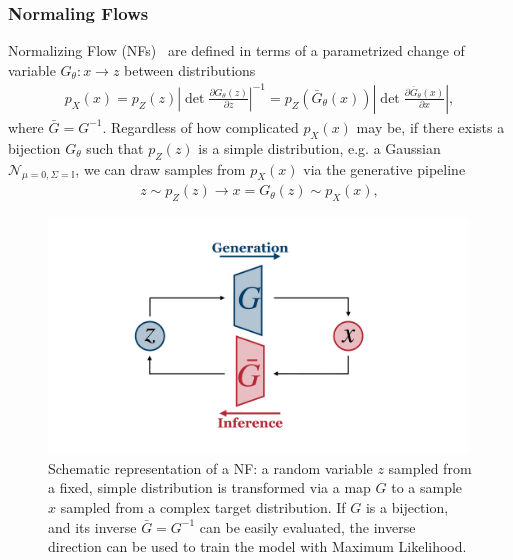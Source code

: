 \subsubsection{Normaling Flows}\label{intro:normflow}
Normalizing Flow (NFs)~\cite{inn,coupling2,glow, nflow1,papamakarios2019normalizing,nflow_review,mller2018neural, grathwohl2018ffjord,chen2019neural} are defined in terms of a parametrized change of variable $G_{\theta}: x \rightarrow z$ between distributions
%
\begin{align}\label{eq:nf}
p_X(x) = p_Z(z) \left|\det \frac{\partial G_{\theta}(z)}{\partial z}\right|^{-1} = p_Z(\bar{G}_{\theta}(x)) \left|\det \frac{\partial \bar{G}_{\theta}(x)}{\partial x}\right|,
\end{align}
%
where $\bar{G} = G^{-1}$.
Regardless of how complicated $p_{X}(x)$ may be, if there exists a bijection $G_{\theta}$ such that $p_Z(z)$ is a simple distribution, e.g. a Gaussian $\mathcal{N}_{\mu=0, \Sigma=\mathbb{I}}$, we can draw samples from $p_{X}(x)$ via the generative pipeline
%
\begin{align}
z \sim p_Z(z) \longrightarrow x = G_{\theta}(z)  \sim p_{X}(x),
\end{align}
%
%
\begin{figure}[t]
\centering
\includegraphics[page = 1, width=0.99\textwidth]{./figures/inn}
\caption{Schematic representation of a NF: a random variable $z$ sampled from a fixed, simple distribution is transformed via a map $G$ to a sample $x$ sampled from a complex target distribution. If $G$ is a bijection, and its inverse $\bar{G} = G^{-1}$ can be easily evaluated, the inverse direction can be used to train the model with Maximum Likelihood.}
\label{fig:NF}
\end{figure}
